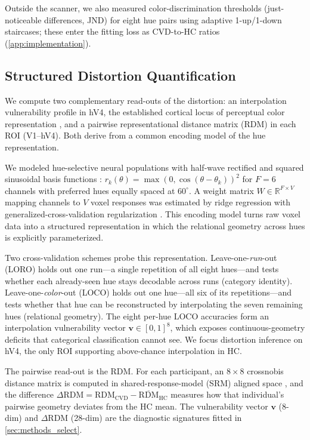 \documentclass{article}
\begin{document}
Outside the scanner, we also measured color-discrimination thresholds (just-noticeable differences, JND) for eight hue pairs using adaptive 1-up/1-down staircases; these enter the fitting loss as CVD-to-HC ratios (\cref{app:implementation}).

\subsection{Structured Distortion Quantification}

We compute two complementary read-outs of the distortion: an interpolation vulnerability profile in hV4, the established cortical locus of perceptual color representation \citep{brouwer2009, bannert2018}, and a pairwise representational distance matrix (RDM) in each ROI (V1--hV4).
Both derive from a common encoding model of the hue representation.

We modeled hue-selective neural populations with half-wave rectified and squared sinusoidal basis functions \citep{brouwer2009}: $r_k(\theta) = \max(0, \cos(\theta - \theta_k))^2$ for $F = 6$ channels with preferred hues equally spaced at $60^\circ$.
A weight matrix $W \in \mathbb{R}^{F \times V}$ mapping channels to $V$ voxel responses was estimated by ridge regression with generalized-cross-validation regularization \citep{golub1979}.
This encoding model turns raw voxel data into a structured representation in which the relational geometry across hues is explicitly parameterized.

Two cross-validation schemes probe this representation.
Leave-one-\emph{run}-out (LORO) holds out one run---a single repetition of all eight hues---and tests whether each already-seen hue stays decodable across runs (category identity).
Leave-one-\emph{color}-out (LOCO) holds out one hue---all six of its repetitions---and tests whether that hue can be reconstructed by interpolating the seven remaining hues (relational geometry).
The eight per-hue LOCO accuracies form an interpolation vulnerability vector $\mathbf{v} \in [0,1]^8$, which exposes continuous-geometry deficits that categorical classification cannot see.
We focus distortion inference on hV4, the only ROI supporting above-chance interpolation in HC.

The pairwise read-out is the RDM.
For each participant, an $8 \times 8$ crossnobis distance matrix \citep{walther2016, nili2014} is computed in shared-response-model (SRM) aligned space \citep{chen2015}, and the difference $\Delta\text{RDM} = \text{RDM}_{\text{CVD}} - \overline{\text{RDM}}_{\text{HC}}$ measures how that individual's pairwise geometry deviates from the HC mean.
The vulnerability vector $\mathbf{v}$ (8-dim) and $\Delta$RDM (28-dim) are the diagnostic signatures fitted in \cref{sec:methods_select}.
\end{document}
